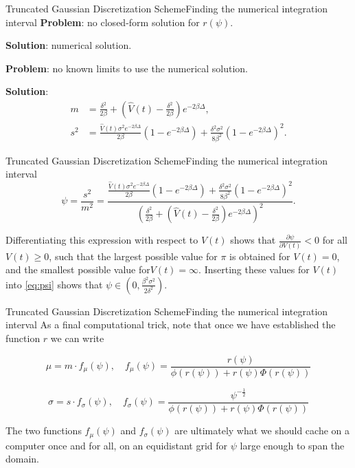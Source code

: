     \begin{frame}{Truncated Gaussian Discretization Scheme}{Finding the numerical integration interval}
        \textbf{Problem}: no closed-form solution for $r(\psi)$. 
        
        \textbf{Solution}: numerical solution.

        \textbf{Problem}: no known limits to use the numerical solution.

        \textbf{Solution}: 
        \begin{align}
            m   &= \frac{\delta^2}{2\beta} + \left(\hat{V}(t) - \frac{\delta^2}{2\beta}\right)e^{-2\beta \Delta},\\
            s^2 &= \frac{\hat{V}(t)\sigma^2e^{-2\beta \Delta}}{2\beta}\left(1 - e^{-2\beta \Delta}\right) + \frac{\delta^2\sigma^2}{8\beta^2}\left(1 - e^{-2\beta \Delta}\right)^2.
        \end{align}
    \end{frame}

    \begin{frame}{Truncated Gaussian Discretization Scheme}{Finding the numerical integration interval}
        \begin{equation}\label{eq:psi}
            \psi = \frac{s^2}{m^2} = \frac{\frac{\hat{V}(t)\sigma^2e^{-2\beta \Delta}}{2\beta}\left(1 - e^{-2\beta \Delta}\right) + \frac{\delta^2\sigma^2}{8\beta^2}\left(1 - e^{-2\beta \Delta}\right)^2}{(\frac{\delta^2}{2\beta} + \left(\hat{V}(t) - \frac{\delta^2}{2\beta}\right)e^{-2\beta \Delta})^2}.
        \end{equation}

        Differentiating this expression with respect to $V(t)$ shows that $\frac{\partial\psi}{\partial V(t)}<0$ for all $V(t)\geq 0$, such that the largest possible value for $\pi$ is 
        obtained for $V(t)=0$, and the smallest possible value for$V(t)=\infty$. Inserting these values for $V(t)$ into \eqref{eq:psi} shows that $\psi \in (0, \frac{\beta^2\sigma^2}{2\delta^2})$.
    \end{frame}

    \begin{frame}{Truncated Gaussian Discretization Scheme}{Finding the numerical integration interval}
        As a final computational trick, note that once we have established the function $r$ we can write
        
        \begin{equation}
        \mu = m\cdot f_\mu(\psi), \quad f_\mu(\psi)= \frac{r(\psi)}{\phi(r(\psi)) + r(\psi)\Phi(r(\psi))}
        \end{equation}

        \begin{equation}
        \sigma = s\cdot f_\sigma(\psi), \quad f_\sigma(\psi)= \frac{\psi^{-\frac{1}{2}}}{\phi(r(\psi)) + r(\psi)\Phi(r(\psi))}
        \end{equation}

        The two functions $f_\mu(\psi)$ and $f_\sigma(\psi)$ are ultimately what we should cache on a computer once and for all, on an equidistant grid for $\psi$ large enough to span the domain.
    \end{frame}
